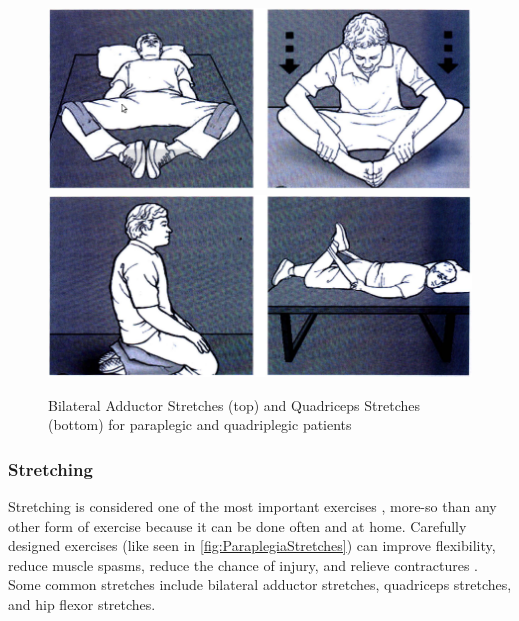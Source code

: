 \begin{figure}[ht!]
    \includegraphics[width=\linewidth]{Figures/Background/BilateralAdductorStretch.png}
    \includegraphics[width=\linewidth]{Figures/Background/QuadricepsStretch.png}
    \caption{Bilateral Adductor Stretches (top) and Quadriceps Stretches (bottom) for paraplegic and quadriplegic patients \cite{RehabParaplegia}}
    \label{fig:ParaplegiaStretches}
\end{figure}

\subsubsection{Stretching}
Stretching is considered one of the most important exercises \cite{RehabParaplegia}, more-so than any other form of exercise because it can be done often and at home. Carefully designed exercises (like seen in \autoref{fig:ParaplegiaStretches}) can improve flexibility, reduce muscle spasms, reduce the chance of injury, and relieve contractures \cite{ParalysisStretchingWeightLoadingPMID} \cite{ParalysisStretchingHarvey} \cite{ParalysisStretchingMichigan}. Some common stretches include bilateral adductor stretches, quadriceps stretches, and hip flexor stretches.

